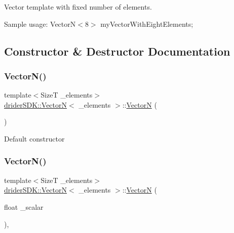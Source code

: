 Vector template with fixed number of elements.

Sample usage\+: Vector\+N$<$8$>$ my\+Vector\+With\+Eight\+Elements; 

\subsection{Constructor \& Destructor Documentation}
\mbox{\label{classdrider_s_d_k_1_1_vector_n_a791435c4907a5ed662d12737f446dc3e}} 
\subsubsection{\texorpdfstring{Vector\+N()}{VectorN()}\hspace{0.1cm}{\footnotesize\ttfamily [1/2]}}
{\footnotesize\ttfamily template$<$SizeT \+\_\+elements$>$ \\
\hyperlink{classdrider_s_d_k_1_1_vector_n}{drider\+S\+D\+K\+::\+VectorN}$<$ \+\_\+elements $>$\+::\hyperlink{classdrider_s_d_k_1_1_vector_n}{VectorN} (\begin{DoxyParamCaption}{ }\end{DoxyParamCaption})\hspace{0.3cm}{\ttfamily [inline]}}

Default constructor \mbox{\label{classdrider_s_d_k_1_1_vector_n_ada33981d7f60f3b1d8a1cfdee2276d77}} 
\subsubsection{\texorpdfstring{Vector\+N()}{VectorN()}\hspace{0.1cm}{\footnotesize\ttfamily [2/2]}}
{\footnotesize\ttfamily template$<$SizeT \+\_\+elements$>$ \\
\hyperlink{classdrider_s_d_k_1_1_vector_n}{drider\+S\+D\+K\+::\+VectorN}$<$ \+\_\+elements $>$\+::\hyperlink{classdrider_s_d_k_1_1_vector_n}{VectorN} (\begin{DoxyParamCaption}\item[{float}]{\+\_\+scalar }\end{DoxyParamCaption})\hspace{0.3cm}{\ttfamily [inline]}, {\ttfamily [explicit]}}

